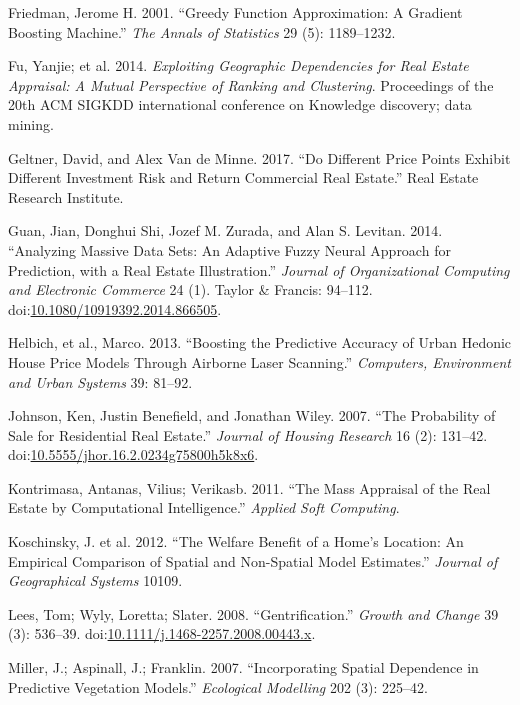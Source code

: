 \documentclass[12pt,]{article}
\begin{document}
\hypertarget{ref-Friedman2001}{}
Friedman, Jerome H. 2001. ``Greedy Function Approximation: A Gradient
Boosting Machine.'' \emph{The Annals of Statistics} 29 (5): 1189--1232.

\hypertarget{ref-Fu2014}{}
Fu, Yanjie; et al. 2014. \emph{Exploiting Geographic Dependencies for
Real Estate Appraisal: A Mutual Perspective of Ranking and Clustering}.
Proceedings of the 20th ACM SIGKDD international conference on Knowledge
discovery; data mining.

\hypertarget{ref-Geltner2017}{}
Geltner, David, and Alex Van de Minne. 2017. ``Do Different Price Points
Exhibit Different Investment Risk and Return Commercial Real Estate.''
Real Estate Research Institute.

\hypertarget{ref-Guan2014}{}
Guan, Jian, Donghui Shi, Jozef M. Zurada, and Alan S. Levitan. 2014.
``Analyzing Massive Data Sets: An Adaptive Fuzzy Neural Approach for
Prediction, with a Real Estate Illustration.'' \emph{Journal of
Organizational Computing and Electronic Commerce} 24 (1). Taylor \&
Francis: 94--112.
doi:\href{https://doi.org/10.1080/10919392.2014.866505}{10.1080/10919392.2014.866505}.

\hypertarget{ref-Helbich2013}{}
Helbich, et al., Marco. 2013. ``Boosting the Predictive Accuracy of
Urban Hedonic House Price Models Through Airborne Laser Scanning.''
\emph{Computers, Environment and Urban Systems} 39: 81--92.

\hypertarget{ref-Johnson2007}{}
Johnson, Ken, Justin Benefield, and Jonathan Wiley. 2007. ``The
Probability of Sale for Residential Real Estate.'' \emph{Journal of
Housing Research} 16 (2): 131--42.
doi:\href{https://doi.org/10.5555/jhor.16.2.0234g75800h5k8x6}{10.5555/jhor.16.2.0234g75800h5k8x6}.

\hypertarget{ref-Kontrimasa2011}{}
Kontrimasa, Antanas, Vilius; Verikasb. 2011. ``The Mass Appraisal of the
Real Estate by Computational Intelligence.'' \emph{Applied Soft
Computing}.

\hypertarget{ref-Koschinsky2012}{}
Koschinsky, J. et al. 2012. ``The Welfare Benefit of a Home's Location:
An Empirical Comparison of Spatial and Non-Spatial Model Estimates.''
\emph{Journal of Geographical Systems} 10109.

\hypertarget{ref-Lees2008}{}
Lees, Tom; Wyly, Loretta; Slater. 2008. ``Gentrification.'' \emph{Growth
and Change} 39 (3): 536--39.
doi:\href{https://doi.org/10.1111/j.1468-2257.2008.00443.x}{10.1111/j.1468-2257.2008.00443.x}.

\hypertarget{ref-Miller2015}{}
Miller, J.; Aspinall, J.; Franklin. 2007. ``Incorporating Spatial
Dependence in Predictive Vegetation Models.'' \emph{Ecological
Modelling} 202 (3): 225--42.
\end{document}
